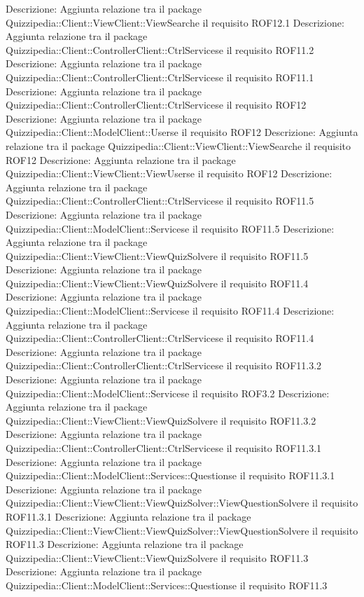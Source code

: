 Descrizione: Aggiunta relazione tra il package Quizzipedia::Client::ViewClient::ViewSearche il requisito ROF12.1 
Descrizione: Aggiunta relazione tra il package Quizzipedia::Client::ControllerClient::CtrlServicese il requisito ROF11.2 
Descrizione: Aggiunta relazione tra il package Quizzipedia::Client::ControllerClient::CtrlServicese il requisito ROF11.1 
Descrizione: Aggiunta relazione tra il package Quizzipedia::Client::ControllerClient::CtrlServicese il requisito ROF12 
Descrizione: Aggiunta relazione tra il package Quizzipedia::Client::ModelClient::Userse il requisito ROF12 
Descrizione: Aggiunta relazione tra il package Quizzipedia::Client::ViewClient::ViewSearche il requisito ROF12 
Descrizione: Aggiunta relazione tra il package Quizzipedia::Client::ViewClient::ViewUserse il requisito ROF12 
Descrizione: Aggiunta relazione tra il package Quizzipedia::Client::ControllerClient::CtrlServicese il requisito ROF11.5 
Descrizione: Aggiunta relazione tra il package Quizzipedia::Client::ModelClient::Servicese il requisito ROF11.5 
Descrizione: Aggiunta relazione tra il package Quizzipedia::Client::ViewClient::ViewQuizSolvere il requisito ROF11.5 
Descrizione: Aggiunta relazione tra il package Quizzipedia::Client::ViewClient::ViewQuizSolvere il requisito ROF11.4 
Descrizione: Aggiunta relazione tra il package Quizzipedia::Client::ModelClient::Servicese il requisito ROF11.4 
Descrizione: Aggiunta relazione tra il package Quizzipedia::Client::ControllerClient::CtrlServicese il requisito ROF11.4 
Descrizione: Aggiunta relazione tra il package Quizzipedia::Client::ControllerClient::CtrlServicese il requisito ROF11.3.2 
Descrizione: Aggiunta relazione tra il package Quizzipedia::Client::ModelClient::Servicese il requisito ROF3.2 
Descrizione: Aggiunta relazione tra il package Quizzipedia::Client::ViewClient::ViewQuizSolvere il requisito ROF11.3.2 
Descrizione: Aggiunta relazione tra il package Quizzipedia::Client::ControllerClient::CtrlServicese il requisito ROF11.3.1 
Descrizione: Aggiunta relazione tra il package Quizzipedia::Client::ModelClient::Services::Questionse il requisito ROF11.3.1 
Descrizione: Aggiunta relazione tra il package Quizzipedia::Client::ViewClient::ViewQuizSolver::ViewQuestionSolvere il requisito ROF11.3.1 
Descrizione: Aggiunta relazione tra il package Quizzipedia::Client::ViewClient::ViewQuizSolver::ViewQuestionSolvere il requisito ROF11.3 
Descrizione: Aggiunta relazione tra il package Quizzipedia::Client::ViewClient::ViewQuizSolvere il requisito ROF11.3 
Descrizione: Aggiunta relazione tra il package Quizzipedia::Client::ModelClient::Services::Questionse il requisito ROF11.3 

